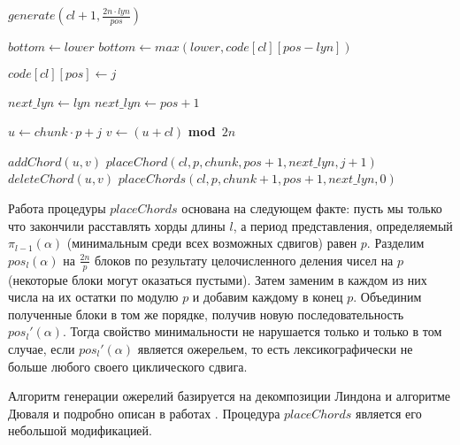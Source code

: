 \documentclass[a4paper,12pt]{article}
\def\MOD{{\bf mod} \,}
\theoremstyle{plain}
\theoremstyle{definition}
\begin{document}
\begin{algorithm}[!t]\label{algorithm:placeChord}
\caption{\small$placeChords(cl, p, chunk, pos, lyn, lower)$}
\begin{algorithmic}[1]
        \IF{$pos$ \MOD $lyn = 0$}
            \STATE $generate(cl + 1, \frac{2 n \cdot lyn}{pos})$
        \ENDIF
        \RETURN
    \ENDIF

        \STATE $bottom \leftarrow lower$
    \ELSE
        \STATE $bottom \leftarrow max(lower, code[cl] [pos - lyn])$
    \ENDIF

        \STATE $code[ cl ] [ pos ] \leftarrow j$

            \STATE $next\_lyn \leftarrow lyn$
        \ELSE
            \STATE $next\_lyn \leftarrow pos + 1$
        \ENDIF

            \STATE $u \leftarrow chunk \cdot p + j$
            \STATE $v \leftarrow (u + cl)$ \MOD $2 n$

                \STATE $addChord(u, v)$
                \STATE $placeChord(cl, p, chunk, pos + 1, next\_lyn, j + 1)$
                \STATE $deleteChord(u, v)$
            \ENDIF
        \ELSE
            \STATE $placeChords(cl, p, chunk + 1, pos + 1, next\_lyn, 0)$
        \ENDIF
    \ENDFOR
\end{algorithmic}
\end{algorithm}

Работа процедуры $placeChords$ основана на следующем факте: пусть мы только что закончили расставлять хорды длины $l$, а период представления,
определяемый $\pi_{l - 1}(\alpha)$ (минимальным среди всех возможных сдвигов) равен $p$. Разделим $pos_l(\alpha)$ на $\frac{2 n}{p}$ блоков по
результату целочисленного деления чисел на $p$ (некоторые блоки могут оказаться пустыми). Затем заменим в каждом из них числа на их остатки по
модулю $p$ и добавим каждому в конец $p$. Объединим полученные блоки в том же порядке, получив новую последовательность $pos_l'(\alpha)$.
Тогда свойство минимальности не нарушается только и только в том случае, если $pos_l'(\alpha)$ является ожерельем, то есть лексикографически
не больше любого своего циклического сдвига.

Алгоритм генерации ожерелий базируется на декомпозиции Линдона и алгоритме Дюваля \cite{Duval1983} и подробно описан в работах
\cite{RuskeySawada1999, Sawada2001}. Процедура $placeChords$ является его небольшой модификацией.
\end{document}
